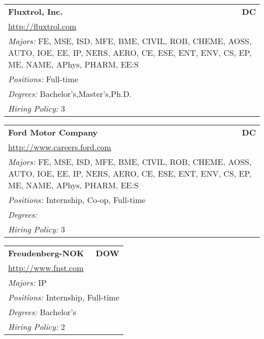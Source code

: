 \documentclass[twoside]{article}
\begin{document}
\begin{center}
\begin{multicols}{3}
\begin{FlushLeft}
\begin{minipage}{.9\columnwidth}\begin{tabularx}{.95\columnwidth}{Xr}
                 {\Large\bf Fluxtrol, Inc.} & {\Large\bf DC}\\
    \multicolumn{2}{p{.95\columnwidth}}{\url{http://fluxtrol.com}}\\
    \multicolumn{2}{p{.95\columnwidth}}{\emph{Majors:} FE, MSE, ISD, MFE, BME, CIVIL, ROB, CHEME, AOSS, AUTO, IOE, EE, IP, NERS, AERO, CE, ESE, ENT, ENV, CS, EP, ME, NAME, APhys, PHARM, EE:S}\\
    \multicolumn{2}{p{.95\columnwidth}}{\emph{Positions:} Full-time}\\
    \multicolumn{2}{p{.95\columnwidth}}{\emph{Degrees:} Bachelor's,Master's,Ph.D.}\\
    \multicolumn{2}{p{.95\columnwidth}}{\emph{Hiring Policy:} 3}\\
    \end{tabularx}
    
\end{minipage}
 
\begin{minipage}{.9\columnwidth}\begin{tabularx}{.95\columnwidth}{Xr}
                 {\Large\bf Ford Motor Company} & {\Large\bf DC}\\
    \multicolumn{2}{p{.95\columnwidth}}{\url{http://www.careers.ford.com}}\\
    \multicolumn{2}{p{.95\columnwidth}}{\emph{Majors:} FE, MSE, ISD, MFE, BME, CIVIL, ROB, CHEME, AOSS, AUTO, IOE, EE, IP, NERS, AERO, CE, ESE, ENT, ENV, CS, EP, ME, NAME, APhys, PHARM, EE:S}\\
    \multicolumn{2}{p{.95\columnwidth}}{\emph{Positions:} Internship, Co-op, Full-time}\\
    \multicolumn{2}{p{.95\columnwidth}}{\emph{Degrees:} }\\
    \multicolumn{2}{p{.95\columnwidth}}{\emph{Hiring Policy:} 3}\\
    \end{tabularx}
    
\end{minipage}
 
\begin{minipage}{.9\columnwidth}\begin{tabularx}{.95\columnwidth}{Xr}
                 {\Large\bf Freudenberg-NOK} & {\Large\bf DOW}\\
    \multicolumn{2}{p{.95\columnwidth}}{\url{http://www.fnst.com}}\\
    \multicolumn{2}{p{.95\columnwidth}}{\emph{Majors:} IP}\\
    \multicolumn{2}{p{.95\columnwidth}}{\emph{Positions:} Internship, Full-time}\\
    \multicolumn{2}{p{.95\columnwidth}}{\emph{Degrees:} Bachelor's}\\
    \multicolumn{2}{p{.95\columnwidth}}{\emph{Hiring Policy:} 2}\\
    \end{tabularx}
    

\end{minipage}
\end{FlushLeft}
\end{multicols}
\end{center}
\end{document}
